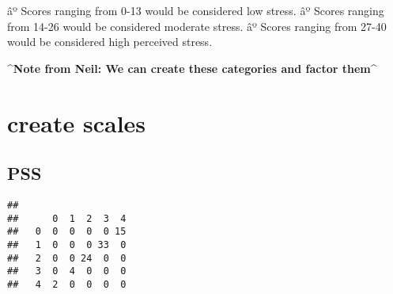 \documentclass[]{article}
\newenvironment{Shaded}{\begin{snugshade}}{\end{snugshade}}
\newcommand{\KeywordTok}[1]{\textcolor[rgb]{0.13,0.29,0.53}{\textbf{#1}}}
\newcommand{\DataTypeTok}[1]{\textcolor[rgb]{0.13,0.29,0.53}{#1}}
\newcommand{\DecValTok}[1]{\textcolor[rgb]{0.00,0.00,0.81}{#1}}
\newcommand{\StringTok}[1]{\textcolor[rgb]{0.31,0.60,0.02}{#1}}
\newcommand{\CommentTok}[1]{\textcolor[rgb]{0.56,0.35,0.01}{\textit{#1}}}
\newcommand{\OperatorTok}[1]{\textcolor[rgb]{0.81,0.36,0.00}{\textbf{#1}}}
\newcommand{\NormalTok}[1]{#1}
\begin{document}
âº Scores ranging from 0-13 would be considered low stress. âº Scores
ranging from 14-26 would be considered moderate stress. âº Scores
ranging from 27-40 would be considered high perceived stress.

\textbf{\^{}Note from Neil: We can create these categories and factor
them\^{}}

\section{create scales}\label{create-scales}

\subsection{PSS}\label{pss}

\begin{Shaded}
\end{Shaded}

\begin{verbatim}
##    
##      0  1  2  3  4
##   0  0  0  0  0 15
##   1  0  0  0 33  0
##   2  0  0 24  0  0
##   3  0  4  0  0  0
##   4  2  0  0  0  0
\end{verbatim}

\begin{Shaded}
\end{Shaded}
\end{document}
